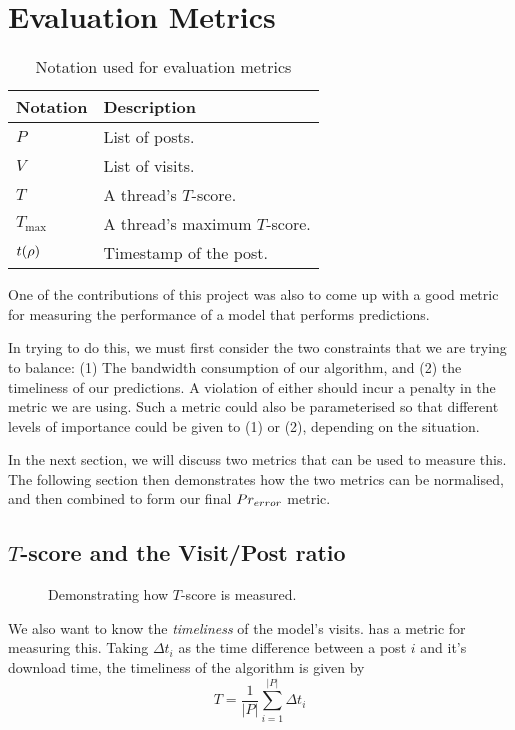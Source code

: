 \renewcommand{\P}{Pr}
\chapter{Evaluation Metrics}


\begin{table}
\begin{center}
\begin{tabular}{l l}
	\hline
Notation	&	Description		\\
	\hline
$P$			&	List of posts. \\
$V$			&	List of visits.\\
$T$			&	A thread's $T$-score. \\
	$T_\text{max}$	&	A thread's maximum $T$-score. \\
$t(\rho)$	&	Timestamp of the post.\\
	\hline
\end{tabular}
\end{center}
	\caption{Notation used for evaluation metrics}
\end{table}


One of the contributions of this project was also to come up with a good metric 
for measuring the performance of a model that performs predictions. 

In trying to do this, we must first consider the two constraints that we are 
trying to balance: (1) The bandwidth consumption of our algorithm, and (2) the 
timeliness of our predictions. A violation of either should incur a penalty in 
the metric we are using. Such a metric could also be parameterised so that 
different levels of importance could be given to (1) or (2), depending on the 
situation.

In the next section, we will discuss two metrics that can be used to measure 
this. The following section then demonstrates how the two metrics can be 
normalised, and then combined to form our final $Pr_{error}$ metric.
\pagebreak
\section{$T$-score and the Visit/Post ratio}

\begin{figure}
	\begin{center}
	
	\caption{Demonstrating how $T$-score is measured.}
	\end{center}
\end{figure}


We also want to know the \emph{timeliness} of the model's visits.  
 has a metric for measuring this. Taking $\Delta t_i$ as the 
time difference between a post $i$ and it's download time, the timeliness of the 
algorithm is given by
\[
	T = \frac{1}{|P|} \sum^{|P|}_{i=1}\Delta t_i
\]

